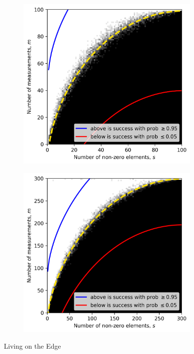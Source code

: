 \begin{figure}
    \begin{subfigure}{0.5\textwidth}
            \includegraphics[width=\linewidth]{pictures/lote_estimates}
        \caption{}
    \end{subfigure}
    \begin{subfigure}{0.5\textwidth}
            \includegraphics[width=\linewidth]{pictures/lote_estimates_d300}
        \caption{}
    \end{subfigure}

    \caption{Living on the Edge}
    \label{fig:lote}
\end{figure}


